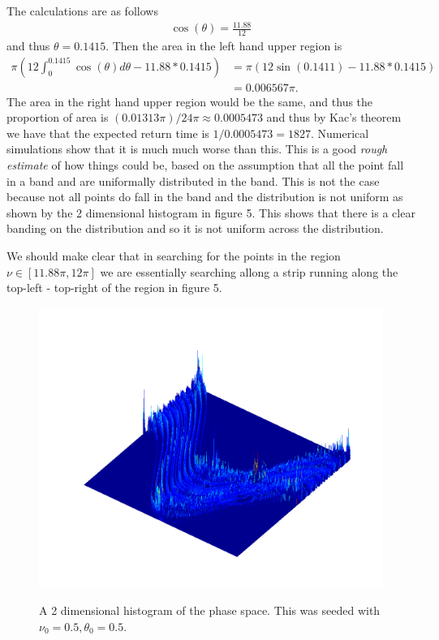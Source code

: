 \documentclass{unswmaths}
\begin{document}
The calculations are as follows
\begin{align*}
    \cos(\theta) = \frac{11.88}{12}
\end{align*}
and thus $ \theta = 0.1415 $. 
Then the area in the left hand upper region is
\begin{align*}
    \pi \left( 12\int_0^{0.1415} \cos(\theta) d\theta - 11.88 * 0.1415\right) &= \pi \left( 12\sin(0.1411) - 11.88 * 0.1415 \right) \\
    &= 0.006567\pi.
\end{align*}
The area in the right hand upper region would be the same, and thus the proportion of area is $ ( 0.01313 \pi) / 24\pi \approx 0.0005473 $ and thus by Kac's theorem we have that the expected return time is $ 1 / 0.0005473 = 1827 $. Numerical simulations show that it is much much worse than this. 
This is a good \emph{rough estimate} of how things could be, based on the assumption that all the point fall in a band and are uniformally distributed in the band. This is not the case because not all points do fall in the band and the distribution is not uniform as shown by the 2 dimensional histogram in figure 5. This shows that there is a clear banding on the distribution and so it is not uniform across the distribution. 

We should make clear that in searching for the points in the region $ \nu \in [11.88\pi, 12\pi] $ we are essentially searching allong a strip running along the top-left - top-right of the region in figure 5.

\begin{figure}[H]
    \includegraphics[scale=0.5]{2d_Histogram}
    \label{2d_Histogram}
    \caption{A 2 dimensional histogram of the phase space. This was seeded with $ \nu_0 = 0.5, \theta_0 = 0.5 $. }
\end{figure}
\end{document}
